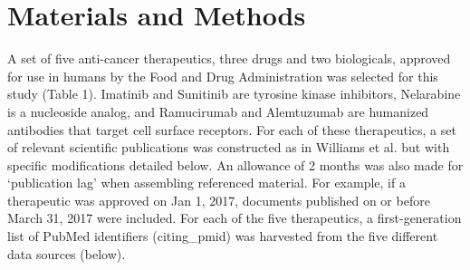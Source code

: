 \documentclass[10pt,letterpaper]{article}
\newlength\savedwidth
\newcommand\thickhline{\noalign{\global\savedwidth\arrayrulewidth\global\arrayrulewidth 2pt}%
\hline
\noalign{\global\arrayrulewidth\savedwidth}}
\begin{document}
\section*{Materials and Methods}  A set of five anti-cancer therapeutics, three drugs and two biologicals, approved for use in humans by the Food and Drug Administration was selected for this study (Table 1). Imatinib and Sunitinib are tyrosine kinase inhibitors, Nelarabine is a nucleoside analog, and Ramucirumab and Alemtuzumab are humanized antibodies that target cell surface receptors. For each of these therapeutics, a set of relevant scientific publications was constructed as in Williams et al.\cite{bibWilliams} but with specific modifications detailed below. An allowance of 2 months was also made for `publication lag' when assembling referenced material. For example, if a therapeutic was approved on Jan 1, 2017, documents published  on or before March 31, 2017 were included. For each of the five therapeutics, a first-generation list of PubMed identifiers (citing\_pmid) was harvested from the five different data sources (below). 
 
\begin{table}[!ht]
\centering
{}
\vspace{2 mm}
\caption{
{\bf Case Studies of Five Anti-Cancer Agents} Five anti-cancer therapeutics, with FDA approval dates ranging from 2001 to 2014, were selected as case studies. The active ingredient for each of these five therapeutics is listed in column 1. While multiple patents are typically associated with a drug or biological, the single US patent number displayed represents the primary invention that preceded approval of the therapeutic. The publication date for each patent is listed in the last column.}
\label{table1}
\end{table}
\end{document}
